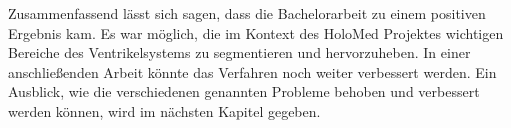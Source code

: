 Zusammenfassend lässt sich sagen, dass die Bachelorarbeit zu einem positiven Ergebnis kam. Es war möglich, die im Kontext des HoloMed Projektes wichtigen Bereiche des Ventrikelsystems zu segmentieren und hervorzuheben.
\newline
In einer anschließenden Arbeit könnte das Verfahren noch weiter verbessert werden. Ein Ausblick, wie die verschiedenen genannten Probleme behoben und verbessert werden können, wird im nächsten Kapitel gegeben.

























